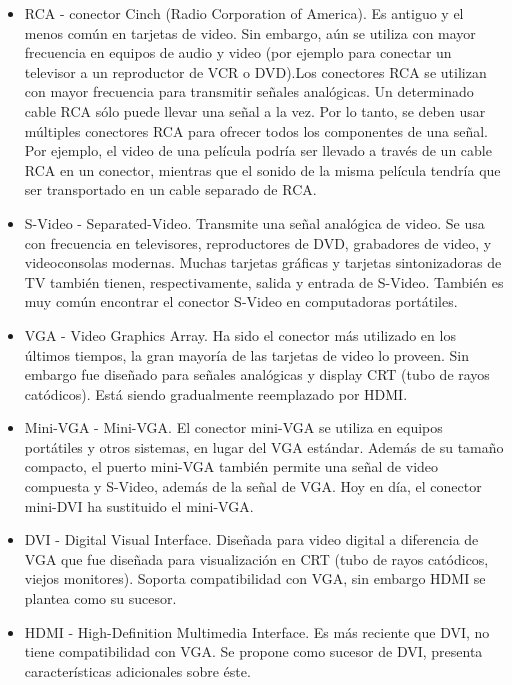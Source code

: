 \documentclass[12pt]{article}
\begin{document}
\begin{itemize}
\item RCA - conector Cinch (Radio Corporation of America). Es antiguo y el menos 
común en tarjetas de video. Sin embargo, aún se utiliza con mayor frecuencia 
en equipos de audio y video (por ejemplo para conectar un televisor a un 
reproductor de VCR o DVD).Los conectores RCA se utilizan con mayor frecuencia 
para transmitir señales analógicas. Un determinado cable RCA sólo puede llevar 
una señal a la vez. Por lo tanto, se deben usar múltiples conectores RCA para 
ofrecer todos los componentes de una señal. Por ejemplo, el video de una 
película podría ser llevado a través de un cable RCA en un conector, 
mientras que el sonido de la misma película tendría que ser transportado en 
un cable separado de RCA. 
\item S-Video - Separated-Video. Transmite una señal analógica de video. 
Se usa con frecuencia en televisores, reproductores de DVD, grabadores de 
video, y videoconsolas modernas. Muchas tarjetas gráficas y tarjetas 
sintonizadoras de TV también tienen, respectivamente, salida y entrada 
de S-Video. También es muy común encontrar el conector S-Video en 
computadoras portátiles.
\item VGA - Video Graphics Array. Ha sido el conector más utilizado en los 
últimos tiempos, la gran mayoría de las tarjetas de video lo proveen. Sin embargo
fue diseñado para señales analógicas y display CRT (tubo de rayos catódicos). 
Está siendo gradualmente reemplazado por HDMI. 
\item Mini-VGA - Mini-VGA. El conector mini-VGA se utiliza en equipos 
portátiles y otros sistemas, en lugar del VGA estándar. Además de su 
tamaño compacto, el puerto mini-VGA también permite una señal de video compuesta 
y S-Video, además de la señal de VGA.  Hoy en día, el conector mini-DVI ha 
sustituido el mini-VGA.
\item DVI - Digital Visual Interface. Diseñada para video digital a 
diferencia de VGA que fue diseñada para visualización en CRT (tubo de 
rayos catódicos, viejos monitores). Soporta compatibilidad con VGA, sin 
embargo HDMI se plantea como su sucesor.  
\item HDMI - High-Definition Multimedia Interface. Es más reciente que 
DVI, no tiene compatibilidad con VGA. Se propone como sucesor de 
DVI, presenta características adicionales sobre éste. 
\end{itemize}
\end{document}
